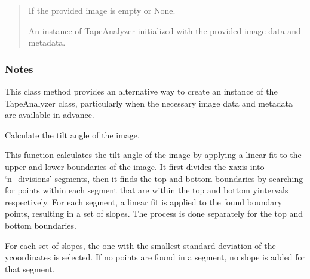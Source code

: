 \documentclass[letterpaper,10pt,english]{sphinxmanual}
\begin{document}
\begin{fulllineitems}
\begin{fulllineitems}
\begin{quote}
\begin{description}
\begin{itemize}
\end{itemize}

\sphinxAtStartPar
{} \textendash{} If the provided image is empty or None.

\sphinxAtStartPar
An instance of TapeAnalyzer initialized with the provided image data and metadata.

\sphinxAtStartPar
{\hyperref[\detokenize{forensicfit.core.tape:forensicfit.core.tape.TapeAnalyzer}]{}}

\end{description}\end{quote}
\subsubsection*{Notes}

\sphinxAtStartPar
This class method provides an alternative way to create an instance of the TapeAnalyzer class, particularly
when the necessary image data and metadata are available in advance.

\end{fulllineitems}


\begin{fulllineitems}
\label{\detokenize{forensicfit.core.tape:forensicfit.core.tape.TapeAnalyzer.get_image_tilt}}
\pysigstartsignatures
{}
\pysigstopsignatures
\sphinxAtStartPar
Calculate the tilt angle of the image.

\sphinxAtStartPar
This function calculates the tilt angle of the image by applying a linear fit to the upper and lower boundaries of the image.
It first divides the x\sphinxhyphen{}axis into ‘n\_divisions’ segments, then it finds the top and bottom boundaries by searching for points
within each segment that are within the top and bottom y\sphinxhyphen{}intervals respectively. For each segment, a linear fit is applied to
the found boundary points, resulting in a set of slopes. The process is done separately for the top and bottom boundaries.

\sphinxAtStartPar
For each set of slopes, the one with the smallest standard deviation of the y\sphinxhyphen{}coordinates is selected.
If no points are found in a segment, no slope is added for that segment.


\end{fulllineitems}
\end{fulllineitems}
\end{document}
